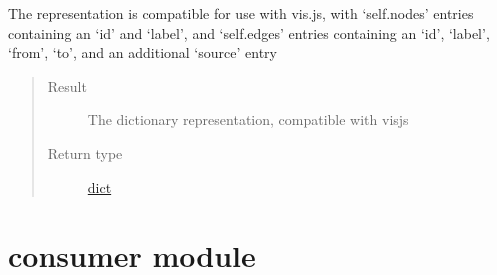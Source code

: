 \documentclass[letterpaper,10pt,english]{sphinxmanual}
\begin{document}
\begin{fulllineitems}
\begin{fulllineitems}
The representation is compatible for use with vis.js, with `self.nodes' entries containing an `id' and `label', and `self.edges' entries containing an `id', `label', `from', `to', and an additional `source' entry
\begin{quote}\begin{description}
\item[{Result}] \leavevmode
The dictionary representation, compatible with visjs

\item[{Return type}] \leavevmode
\href{https://docs.python.org/2/library/stdtypes.html\#dict}{dict}

\end{description}\end{quote}

\end{fulllineitems}


\end{fulllineitems}



\section{consumer module}
\label{\detokenize{consumer:consumer-module}}\label{\detokenize{consumer:module-consumer}}\label{\detokenize{consumer::doc}}
\end{document}
